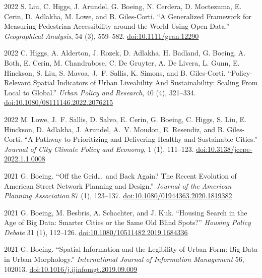 \documentclass[11pt,letterpaper]{report}
\begin{document}
\begin{tablist}
        \item[2022] \tab{}S. Liu, C. Higgs, J. Arundel, G. Boeing, N. Cerdera, D. Moctezuma, E. Cerin, D. Adlakha, M. Lowe, and B. Giles-Corti. \enquote{A Generalized Framework for Measuring Pedestrian Accessibility around the World Using Open Data.} \textit{Geographical Analysis}, 54 (3), 559--582. \href{https://doi.org/10.1111/gean.12290}{doi:10.1111/gean.12290}

        \item[2022] \tab{}C. Higgs, A. Alderton, J. Rozek, D. Adlakha, H. Badland, G. Boeing, A. Both, E. Cerin, M. Chandrabose, C. De Gruyter, A. De Livera, L. Gunn, E. Hinckson, S. Liu, S. Mavoa, J.~F. Sallis, K. Simons, and B. Giles-Corti. \enquote{Policy-Relevant Spatial Indicators of Urban Liveability And Sustainability: Scaling From Local to Global.} \textit{Urban Policy and Research}, 40 (4), 321--334. \href{https://doi.org/10.1080/08111146.2022.2076215}{doi:10.1080/08111146.2022.2076215}

        \item[2022] \tab{}M. Lowe, J.~F. Sallis, D. Salvo, E. Cerin, G. Boeing, C. Higgs, S. Liu, E. Hinckson, D. Adlakha, J. Arundel, A.~V. Moudon, E. Resendiz, and B. Giles-Corti. \enquote{A Pathway to Prioritizing and Delivering Healthy and Sustainable Cities.} \textit{Journal of City Climate Policy and Economy}, 1 (1), 111--123. \href{https://doi.org/10.3138/jccpe-2022.1.1.0008}{doi:10.3138/jccpe-2022.1.1.0008}

        \item[2021] \tab{}G. Boeing. \enquote{Off the Grid\ldots\ and Back Again? The Recent Evolution of American Street Network Planning and Design.} \textit{Journal of the American Planning Association} 87 (1), 123--137. \href{https://doi.org/10.1080/01944363.2020.1819382}{doi:10.1080/01944363.2020.1819382}

        \item[2021] \tab{}G. Boeing, M. Besbris, A. Schachter, and J. Kuk. \enquote{Housing Search in the Age of Big Data: Smarter Cities or the Same Old Blind Spots?} \textit{Housing Policy Debate} 31 (1), 112--126. \href{https://doi.org/10.1080/10511482.2019.1684336}{doi:10.1080/10511482.2019.1684336}

        \item[2021] \tab{}G. Boeing. \enquote{Spatial Information and the Legibility of Urban Form: Big Data in Urban Morphology.} \textit{International Journal of Information Management} 56, 102013. \href{https://doi.org/10.1016/j.ijinfomgt.2019.09.009}{doi:10.1016/j.ijinfomgt.2019.09.009}


\end{tablist}
\end{document}
